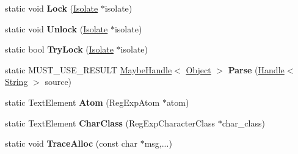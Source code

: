 \begin{DoxyCompactItemize}
\item 
\hypertarget{classv8_1_1internal_1_1_b_a_s_e___e_m_b_e_d_d_e_d_aeaef508a9c7831c2ee5808905b28fa5d}{}static void {\bfseries Lock} (\hyperlink{classv8_1_1internal_1_1_isolate}{Isolate} $\ast$isolate)\label{classv8_1_1internal_1_1_b_a_s_e___e_m_b_e_d_d_e_d_aeaef508a9c7831c2ee5808905b28fa5d}

\item 
\hypertarget{classv8_1_1internal_1_1_b_a_s_e___e_m_b_e_d_d_e_d_a3bc3448b66fc2e5364b532e9a29d4b60}{}static void {\bfseries Unlock} (\hyperlink{classv8_1_1internal_1_1_isolate}{Isolate} $\ast$isolate)\label{classv8_1_1internal_1_1_b_a_s_e___e_m_b_e_d_d_e_d_a3bc3448b66fc2e5364b532e9a29d4b60}

\item 
\hypertarget{classv8_1_1internal_1_1_b_a_s_e___e_m_b_e_d_d_e_d_a3d88e6711536c4b333e0b022d42dc0ae}{}static bool {\bfseries Try\+Lock} (\hyperlink{classv8_1_1internal_1_1_isolate}{Isolate} $\ast$isolate)\label{classv8_1_1internal_1_1_b_a_s_e___e_m_b_e_d_d_e_d_a3d88e6711536c4b333e0b022d42dc0ae}

\item 
\hypertarget{classv8_1_1internal_1_1_b_a_s_e___e_m_b_e_d_d_e_d_ad74927d60a6db495102b0d714ccbbaf4}{}static M\+U\+S\+T\+\_\+\+U\+S\+E\+\_\+\+R\+E\+S\+U\+L\+T \hyperlink{classv8_1_1internal_1_1_maybe_handle}{Maybe\+Handle}$<$ \hyperlink{classv8_1_1internal_1_1_object}{Object} $>$ {\bfseries Parse} (\hyperlink{classv8_1_1internal_1_1_handle}{Handle}$<$ \hyperlink{classv8_1_1internal_1_1_string}{String} $>$ source)\label{classv8_1_1internal_1_1_b_a_s_e___e_m_b_e_d_d_e_d_ad74927d60a6db495102b0d714ccbbaf4}

\item 
\hypertarget{classv8_1_1internal_1_1_b_a_s_e___e_m_b_e_d_d_e_d_a3bf856d7ead412d4a0e95ffb1fdef419}{}static Text\+Element {\bfseries Atom} (Reg\+Exp\+Atom $\ast$atom)\label{classv8_1_1internal_1_1_b_a_s_e___e_m_b_e_d_d_e_d_a3bf856d7ead412d4a0e95ffb1fdef419}

\item 
\hypertarget{classv8_1_1internal_1_1_b_a_s_e___e_m_b_e_d_d_e_d_a6e3db58fd967a37c15787cc778b57719}{}static Text\+Element {\bfseries Char\+Class} (Reg\+Exp\+Character\+Class $\ast$char\+\_\+class)\label{classv8_1_1internal_1_1_b_a_s_e___e_m_b_e_d_d_e_d_a6e3db58fd967a37c15787cc778b57719}

\item 
\hypertarget{classv8_1_1internal_1_1_b_a_s_e___e_m_b_e_d_d_e_d_abe87c14f6039a373b8bb92d8fcc464f6}{}static void {\bfseries Trace\+Alloc} (const char $\ast$msg,...)\label{classv8_1_1internal_1_1_b_a_s_e___e_m_b_e_d_d_e_d_abe87c14f6039a373b8bb92d8fcc464f6}


\end{DoxyCompactItemize}
